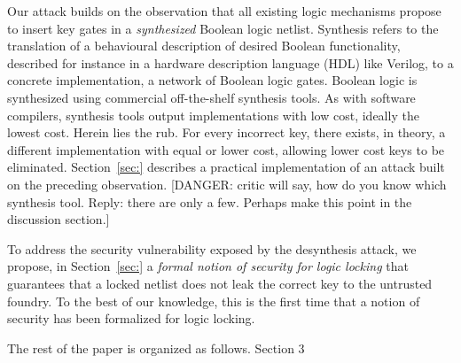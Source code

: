 Our attack builds on the observation that 
all existing 
logic mechanisms propose to insert key gates 
in a \emph{synthesized} 
Boolean logic netlist. 
Synthesis refers to 
the translation 
of a behavioural description of 
desired Boolean functionality, described for instance in 
a hardware description language (HDL) like Verilog, to a 
concrete implementation, a network 
of Boolean logic gates. Boolean logic is 
synthesized using 
commercial off-the-shelf synthesis tools. As with software 
compilers, synthesis tools output implementations with low 
cost, ideally the lowest cost. 
Herein lies the rub. For every incorrect key, 
there 
exists, in theory, a
different 
implementation with equal or lower cost, allowing 
lower cost keys to be eliminated. 
Section~\ref{sec:} describes a 
practical implementation of an attack built on the preceding 
observation. 
[DANGER: critic will say, how do you know which synthesis tool. 
Reply: there are only a few. Perhaps make this point in the 
discussion section.]


To address the security vulnerability exposed by the 
desynthesis attack,
we propose, in Section~\ref{sec:} 
a \emph{formal notion of security 
for logic locking} that guarantees that a locked netlist 
does not leak the correct key to the untrusted foundry. To the 
best of our knowledge, this is the first time that 
a notion of security has been formalized for logic locking. 







 
   





 
 






The rest of the paper is organized as follows. Section 3 
